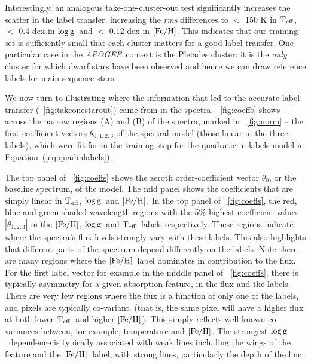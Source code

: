 \documentclass[12pt, preprint]{aastex}
\newcommand{\apogee}{\textsl{APOGEE}}
\newcommand{\teff}{\mbox{$\rm T_{eff}$}}
\newcommand{\feh}{\mbox{$\rm [Fe/H]$}}
\newcommand{\logg}{\mbox{$\rm \log g$}}
\begin{document}
Interestingly, an analogous take-one-cluster-out test significantly increases the scatter in the label transfer, 
increasing the \textit{rms} differences to $<$ 150 K in \teff, $<$ 0.4 dex in \logg\ and $<$ 0.12 dex in \feh.
This indicates that our training set is sufficiently small that each cluster matters for a good label transfer. 
One particular case in the \apogee\ context is the Pleiades cluster: it is the \textit{only} cluster for which dwarf stars have been observed and hence we can draw reference labels for main sequence stars. 


 
We now turn to illustrating where the information that led to the accurate label transfer (\figurename~\ref{fig:takeonestarout}) came from in the spectra.
\figurename~\ref{fig:coeffs} shows -- across the narrow regions (A) and (B) of the spectra, marked in \figurename~\ref{fig:norm} -- the first coefficient vectors $\theta_{0,1,2,3}$ of the spectral model (those linear in the three labels), which were fit for in the training step for the quadratic-in-labels model in Equation~(\ref{eq:quadinlabels}). 


The top panel of \figurename~\ref{fig:coeffs} shows the zeroth order-coefficient vector $\theta_0$, or the baseline spectrum, of the model. 
The mid panel shows the coefficients that are simply linear in \teff, \logg\ and \feh.
In the top panel of \figurename~\ref{fig:coeffs}, the red, blue and green shaded wavelength regions with the 5\% 
highest coefficient values $|\theta_{1,2,3}|$ in the \feh, \logg\ and \teff\ labels respectively. 
These regions indicate where the spectra's flux levels strongly vary with these labels.
This also highlights that different parts of the spectrum depend differently on the labels. Note there are many regions where the \feh\ label dominates in contribution to the flux.
For the first label vector for example in the middle panel of \figurename~\ref{fig:coeffs}, 
there is typically asymmetry for a given absorption feature, in the flux and the labels. 
There are very few regions where the flux is a function of only one of the labels, and pixels are typically co-variant. 
(that is, the same pixel will have a higher flux at both lower \teff\ and higher \feh). 
This simply reflects well-known co-variances between, for example, temperature and \feh .
The strongest \logg\ dependence is typically associated with weak lines including the wings of the 
feature and the \feh\ label, with strong lines, particularly the depth of the line. 
\end{document}
